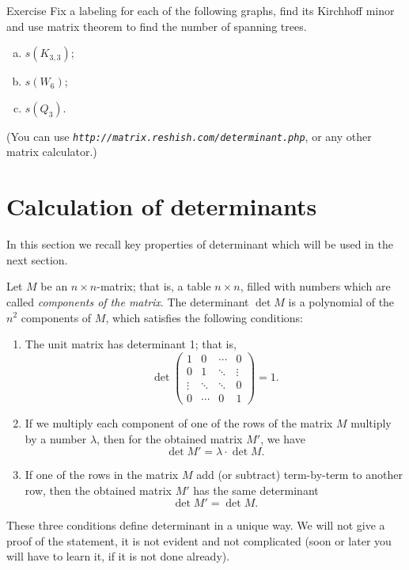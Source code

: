 \begin{thm}{Exercise}
Fix a labeling for each of the following graphs, 
find its Kirchhoff minor and use matrix theorem to find the number of spanning trees.
\begin{enumerate}[(a)]
\item $s(K_{3,3})$;
\item $s(W_6)$;
\item $s(Q_3)$.
\end{enumerate}
(You can use {}\emph{\texttt{http://matrix.reshish.com/determinant.php}}, or any other matrix calculator.)
\end{thm}


\section*{Calculation of determinants}

In this section we recall key properties of determinant which will be used in the next section.

Let $M$ be an $n{\times}n$-matrix; that is, a table $n{\times}n$, filled with numbers which are called {}\emph{components of the matrix}.
The determinant $\det M$ is a polynomial of the $n^2$ components of $M$,
which satisfies the following conditions:
\begin{enumerate}
 \item\label{1} The unit matrix has determinant 1; that is,
\[
\det\left(
\begin{matrix}
1&0&\cdots&0
\\
0&1&\ddots&\vdots
\\
\vdots&\ddots&\ddots&0
\\
0&\cdots&0&1
\end{matrix}
\right)=1.
\]
\item\label{2} If we multiply each component of one of the rows of the matrix $M$ multiply by a number $\lambda$, then for the obtained matrix $M'$, we have
\[\det M'=\lambda\cdot \det M.\]

\item\label{3} If one of the rows in the matrix $M$ add (or subtract) term-by-term to another row, then the obtained matrix $M'$ has the same determinant
\[\det M'= \det M.\]
\end{enumerate}
These three conditions define determinant in a unique way. 
We will not give a proof of the statement, it is not evident and not complicated (soon or later you will have to learn it, if it is not done already).

